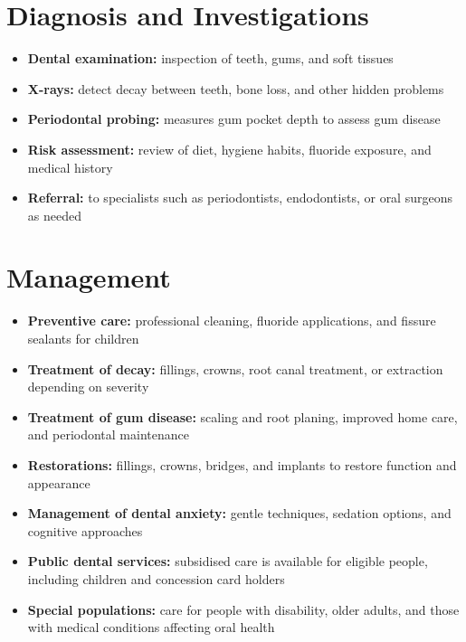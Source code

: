 \section*{Diagnosis and Investigations}
\begin{itemize}
    \item \textbf{Dental examination:} inspection of teeth, gums, and soft tissues
    \item \textbf{X-rays:} detect decay between teeth, bone loss, and other hidden problems
    \item \textbf{Periodontal probing:} measures gum pocket depth to assess gum disease
    \item \textbf{Risk assessment:} review of diet, hygiene habits, fluoride exposure, and medical history
    \item \textbf{Referral:} to specialists such as periodontists, endodontists, or oral surgeons as needed
\end{itemize}

\section*{Management}
\begin{itemize}
    \item \textbf{Preventive care:} professional cleaning, fluoride applications, and fissure sealants for children
    \item \textbf{Treatment of decay:} fillings, crowns, root canal treatment, or extraction depending on severity
    \item \textbf{Treatment of gum disease:} scaling and root planing, improved home care, and periodontal maintenance
    \item \textbf{Restorations:} fillings, crowns, bridges, and implants to restore function and appearance
    \item \textbf{Management of dental anxiety:} gentle techniques, sedation options, and cognitive approaches
    \item \textbf{Public dental services:} subsidised care is available for eligible people, including children and concession card holders
    \item \textbf{Special populations:} care for people with disability, older adults, and those with medical conditions affecting oral health
\end{itemize}

